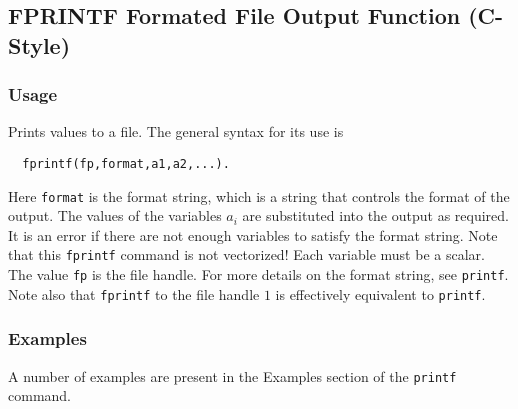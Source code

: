 %
%
%
\subsection{FPRINTF Formated File Output Function (C-Style)}
\subsubsection{Usage}
Prints values to a file.  The general syntax for its use is
\begin{verbatim}
  fprintf(fp,format,a1,a2,...).
\end{verbatim}
Here \verb|format| is the format string, which is a string that
controls the format of the output.  The values of the variables
$a_i$ are substituted into the output as required.  It is
an error if there are not enough variables to satisfy the format
string.  Note that this \verb|fprintf| command is not vectorized!  Each
variable must be a scalar.  The value \verb|fp| is the file handle.  For
more details on the format string, see \verb|printf|.  Note also that \verb|fprintf| to the file handle $1$ is effectively equivalent to \verb|printf|.
\subsubsection{Examples}
A number of examples are present in the Examples section of the \verb|printf| command.
